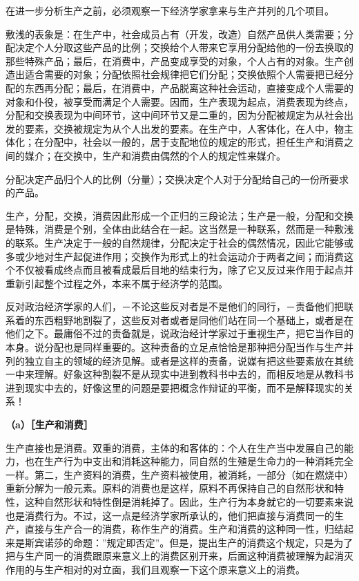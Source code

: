 \documentclass[a4paper,twoside,12pt,AutoFakeBold]{ctexart}
\begin{document}
在进一步分析生产之前，必须观察一下经济学家拿来与生产并列的几个项目。

敷浅的表象是：在生产中，社会成员占有（开发，改造）自然产品供人类需要；分配决定个人分取这些产品的比例；交换给个人带来它享用分配给他的一份去换取的那些特殊产品；最后，在消费中，产品变成享受的对象，个人占有的对象。生产创造出适合需要的对象；分配依照社会规律把它们分配；交换依照个人需要把已经分配的东西再分配；最后，在消费中，产品脱离这种社会运动，直接变成个人需要的对象和仆役，被享受而满足个人需要。因而，生产表现为起点，消费表现为终点，分配和交换表现为中间环节，这中间环节又是二重的，因为分配被规定为从社会出发的要素，交换被规定为从个人出发的要素。在生产中，人客体化，在人中，物主体化；在分配中，社会以一般的，居于支配地位的规定的形式，担任生产和消费之间的媒介；在交换中，生产和消费由偶然的个人的规定性来媒介。

分配决定产品归个人的比例（分量）；交换决定个人对于分配给自己的一份所要求的产品。

生产，分配，交换，消费因此形成一个正归的三段论法；生产是一般，分配和交换是特殊，消费是个别，全体由此结合在一起。这当然是一种联系，然而是一种敷浅的联系。生产决定于一般的自然规律，分配决定于社会的偶然情况，因此它能够或多或少地对生产起促进作用；交换作为形式上的社会运动介于两者之间；而消费这个不仅被看成终点而且被看成最后目地的结束行为，除了它又反过来作用于起点并重新引起整个过程之外，本来不属于经济学的范围。

反对政治经济学家的人们，－不论这些反对者是不是他们的同行，－责备他们把联系着的东西粗野地割裂了，这些反对者或者是同他们站在同一个基础上，或者是在他们之下。最庸俗不过的责备就是，说政治经计学家过于重视生产，把它当作目的本身。说分配也是同样重要的。这种责备的立足点恰恰是那种把分配当作与生产并列的独立自主的领域的经济见解。或者是这样的责备，说媒有把这些要素放在其统一中来理解。好象这种割裂不是从现实中进到教科书中去的，而相反地是从教科书进到现实中去的，好像这里的问题是要把概念作辩证的平衡，而不是解释现实的关系！

\textbf{（a）［生产和消费］}

生产直接也是消费。双重的消费，主体的和客体的：个人在生产当中发展自己的能力，也在生产行为中支出和消耗这种能力，同自然的生殖是生命力的一种消耗完全一样。第二，生产资料的消费，生产资料被使用，被消耗，一部分（如在燃烧中）重新分解为一般元素。原料的消费也是这样，原料不再保持自己的自然形状和特性，这种自然形状和特性倒是消耗掉了。因此，生产行为本身就它的一切要素来说也是消费行为。不过，这一点是经济学家所承认的，他们把直接与消费同一的生产，直接与生产合一的消费，称作生产的消费。生产和消费的这种同一性，归结起来是斯宾诺莎的命题：”规定即否定”。但是，提出生产的消费这个规定，只是为了把与生产同一的消费跟原来意义上的消费区别开来，后面这种消费被理解为起消灭作用的与生产相对的对立面，我们且观察一下这个原来意义上的消费。
\end{document}
